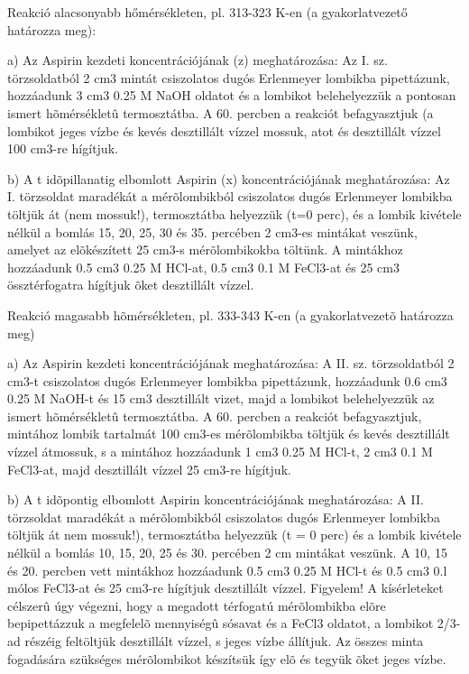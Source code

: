 \documentclass[a4paper, 12pt, twoside]{article}
\begin{document}
Reakció alacsonyabb hőmérsékleten, pl. 313-323 K-en (a gyakorlatvezető határozza meg):

a) Az Aspirin kezdeti koncentrációjának (z) meghatározása:
Az I. sz. törzsoldatból 2 cm3 mintát csiszolatos dugós Erlenmeyer lombikba pipettázunk, hozzáadunk 3 cm3 0.25 M NaOH oldatot és a lombikot belehelyezzük a pontosan ismert hõmérsékletû termosztátba. 
A 60. percben a reakciót befagyasztjuk (a lombikot jeges vízbe és kevés desztillált vízzel mossuk, atot és desztillált vízzel 100 cm3-re hígítjuk.


b) A t idõpillanatig elbomlott Aspirin (x) koncentrációjának meghatározása:
Az I. törzsoldat maradékát a mérõlombikból csiszolatos dugós Erlenmeyer lombikba töltjük át (nem mossuk!), termosztátba helyezzük (t=0 perc), és a lombik kivétele nélkül a bomlás 15, 20, 25, 30 és 35. percében 2 cm3-es mintákat veszünk, amelyet az elõkészített 25 cm3-s mérõlombikokba töltünk.
A mintákhoz hozzáadunk 0.5 cm3 0.25 M HCl-at, 0.5 cm3 0.1 M FeCl3-at és 25 cm3 össztérfogatra hígítjuk õket desztillált vízzel.


Reakció magasabb hõmérsékleten, pl. 333-343 K-en (a gyakorlatvezetõ határozza meg)


a) Az Aspirin kezdeti koncentrációjának meghatározása:
A II. sz. törzsoldatból 2 cm3-t csiszolatos dugós Erlenmeyer lombikba pipettázunk, hozzáadunk 0.6 cm3 0.25 M NaOH-t és 15 cm3 desztillált vizet, majd a lombikot belehelyezzük az ismert hõmérsékletû termosztátba.
A 60. percben a reakciót befagyasztjuk, mintához lombik tartalmát 100 cm3-es mérõlombikba töltjük és kevés desztillált vízzel átmossuk, s a mintához hozzáadunk 1 cm3 0.25 M HCl-t, 2 cm3 0.1 M FeCl3-at, majd desztillált vízzel 25 cm3-re hígítjuk.

b) A t idõpontig elbomlott Aspirin koncentrációjának meghatározása:
A II. törzsoldat maradékát a mérõlombikból csiszolatos dugós Erlenmeyer lombikba töltjük át nem mossuk!), termosztátba helyezzük (t = 0 perc) és a lombik kivétele nélkül a bomlás 10, 15, 20, 25 és 30. percében 2 cm mintákat veszünk.
A 10, 15 és 20. percben vett mintákhoz hozzáadunk 0.5 cm3 0.25 M HCl-t és 0.5 cm3 0.l mólos FeCl3-at és 25 cm3-re hígítjuk desztillált vízzel.
Figyelem!
A kísérleteket célszerû úgy végezni, hogy a megadott térfogatú mérõlombikba elõre bepipettázzuk a megfelelõ mennyiségû sósavat és a FeCl3 oldatot, a lombikot 2/3-ad részéig feltöltjük desztillált vízzel, s jeges vízbe állítjuk. 
Az összes minta fogadására szükséges mérõlombikot készítsük így elõ és tegyük õket jeges vízbe.
\end{document}
